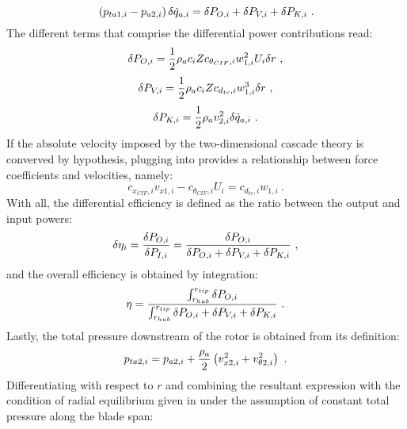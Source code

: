 \begin{equation}{\label{eq:total-to-static_power_input}}
	\left(p_{ta1,i} - p_{a2,i}\right)\delta\dot{q}_{a,i} = \delta{P_{O,i}} + \delta{P_{V,i}} + \delta{P_{K,i}} \ .
\end{equation}
The different terms that comprise the differential power contributions read:
\begin{equation}{\label{eq:differential_power_output}}
	\delta{P_{O,i}} = \frac{1}{2}\rho_{a}c_{i}Zc_{\theta_{CIF},i}w_{1,i}^{2}U_{i}\delta{r} \ ,
\end{equation}
\begin{equation}{\label{eq:differential_viscous_power}}
	\delta{P_{V,i}} = \frac{1}{2}\rho_{a}c_{i}Zc_{d_{tc},i}w_{1,i}^{3}\delta{r} \ ,
\end{equation}
\begin{equation}{\label{eq:differential_kinetic_power}}
	\delta{P_{K,i}} = \frac{1}{2}\rho_{a}v_{2,i}^{2}\delta\dot{q}_{a,i} \ .
\end{equation}
If the absolute velocity imposed by the two-dimensional cascade theory is converved by hypothesis, plugging  into  provides a relationship between force coefficients and velocities, namely:
\begin{equation}
	c_{x_{CIF},i}v_{x1,i} - c_{\theta_{CIF},i}U_{i} = c_{d_{tc},i}w_{1,i} \ .
\end{equation}
With all, the differential efficiency is defined as the ratio between the output and input powers:
\begin{equation}{\label{eq:differential_efficiency}}
	\delta\eta_{i} = \frac{\delta{P_{O,i}}}{\delta{P_{I,i}}} = \frac{\delta{P_{O,i}}}{\delta{P_{O,i}} + \delta{P_{V,i}} + \delta{P_{K,i}}} \ ,
\end{equation}
and the overall efficiency is obtained by integration:
\begin{equation}{\label{eq:efficiency}}
	\eta =  \frac{\int_{r_{hub}}^{r_{tip}}\delta{P_{O,i}}}{\int_{r_{hub}}^{r_{tip}}\delta{P_{O,i}} + \delta{P_{V,i}} + \delta{P_{K,i}}} \ .
\end{equation}
Lastly, the total pressure downstream of the rotor is obtained from its definition:
\begin{equation}{\label{eq:downstream_total_pressure}}
	p_{ta2,i} = p_{a2,i} + \frac{\rho_{a}}{2}\left(v_{x2,i}^{2} + v_{\theta2,i}^{2}\right) \ .
\end{equation}
Differentiating  with respect to $r$ and combining the resultant expression with the condition of radial equilibrium given in  under the assumption of constant total pressure along the blade span:

